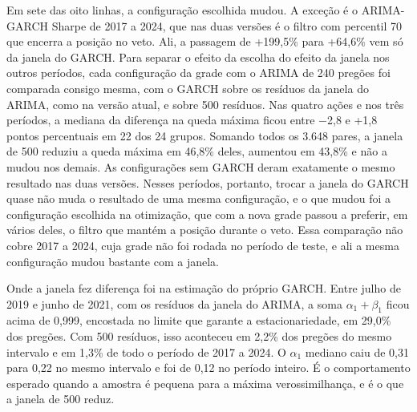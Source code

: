 Em sete das oito linhas, a configuração escolhida mudou. A exceção é o
ARIMA-GARCH Sharpe de 2017 a 2024, que nas duas versões é o filtro com percentil
70 que encerra a posição no veto. Ali, a passagem de +199,5\% para +64,6\% vem
só da janela do GARCH. Para separar o efeito da escolha do efeito da janela nos
outros períodos, cada configuração da grade com o ARIMA de 240
pregões foi comparada consigo mesma, com o GARCH sobre os resíduos da janela do
ARIMA, como na versão atual, e sobre 500 resíduos. Nas quatro ações e nos três
períodos, a mediana da diferença na queda máxima ficou entre $-$2,8 e +1,8
pontos percentuais em 22 dos 24 grupos. Somando todos os 3.648 pares, a janela de
500 reduziu a queda máxima em 46,8\% deles, aumentou em 43,8\% e não a mudou nos
demais. As configurações sem GARCH deram exatamente o
mesmo resultado nas duas versões. Nesses períodos, portanto, trocar a janela do GARCH
quase não muda o resultado de uma mesma configuração, e o que mudou foi a
configuração escolhida na otimização, que com a nova grade passou a preferir, em
vários deles, o filtro que mantém a posição durante o veto. Essa comparação não
cobre 2017 a 2024, cuja grade não foi rodada no período de teste, e ali a mesma
configuração mudou bastante com a janela.

Onde a janela fez diferença foi na estimação do próprio GARCH. Entre julho de 2019
e junho de 2021, com os resíduos da janela do ARIMA, a soma $\alpha_1 + \beta_1$
ficou acima de 0,999, encostada no limite que garante a estacionariedade, em
29,0\% dos pregões. Com 500 resíduos, isso aconteceu em 2,2\% dos pregões do mesmo
intervalo e em 1,3\% de todo o período de 2017 a 2024. O $\alpha_1$ mediano caiu de
0,31 para 0,22 no mesmo intervalo e foi de 0,12 no período inteiro. É o
comportamento esperado quando a amostra é pequena para a máxima verossimilhança,
e é o que a janela de 500 reduz.
